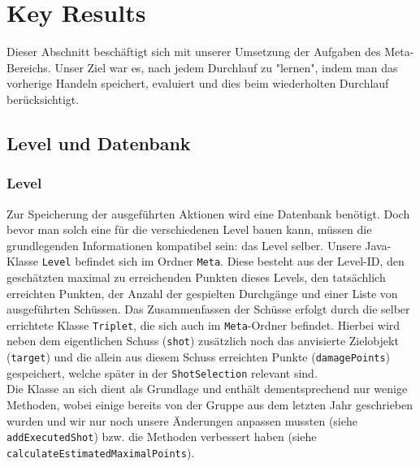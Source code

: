 \section{Key Results}
Dieser Abschnitt beschäftigt sich mit unserer Umsetzung der Aufgaben des Meta-Bereichs. Unser Ziel war es, nach jedem Durchlauf zu "lernen", indem man das vorherige Handeln speichert, evaluiert und dies beim wiederholten Durchlauf berücksichtigt.

\subsection{Level und Datenbank}

\subsubsection{Level}
Zur Speicherung der ausgeführten Aktionen wird eine Datenbank benötigt. Doch bevor man solch eine für die verschiedenen Level bauen kann, müssen die grundlegenden Informationen kompatibel sein: das Level selber. Unsere Java-Klasse \texttt{Level} befindet sich im Ordner \texttt{Meta}. Diese besteht aus der Level-ID, den geschätzten maximal zu erreichenden Punkten dieses Levels, den tatsächlich erreichten Punkten, der Anzahl der gespielten Durchgänge und einer Liste von ausgeführten Schüssen. Das Zusammenfassen der Schüsse erfolgt durch die selber errichtete Klasse \texttt{Triplet}, die sich auch im \texttt{Meta}-Ordner befindet. Hierbei wird neben dem eigentlichen Schuss (\texttt{shot}) zusätzlich noch das anvisierte Zielobjekt (\texttt{target}) und die allein aus diesem Schuss erreichten Punkte (\texttt{damagePoints}) gespeichert, welche später in der \texttt{ShotSelection} relevant sind. \\
Die Klasse an sich dient als Grundlage und enthält dementsprechend nur wenige Methoden, wobei einige bereits von der Gruppe aus dem letzten Jahr geschrieben wurden und wir nur noch unsere Änderungen anpassen mussten (siehe \texttt{addExecutedShot}) bzw. die Methoden verbessert haben (siehe \texttt{calculateEstimatedMaximalPoints}). 

